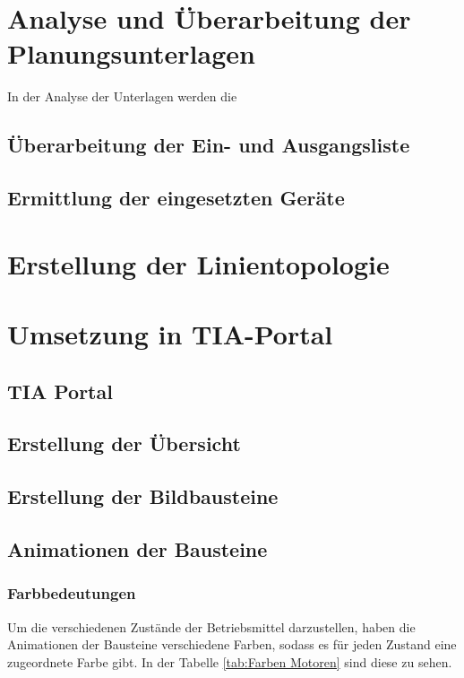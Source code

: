 \chapter{Analyse und Überarbeitung der Planungsunterlagen}

In der Analyse der Unterlagen werden die 

\section{Überarbeitung der Ein- und Ausgangsliste}

\section{Ermittlung der eingesetzten Geräte}

\chapter{Erstellung der Linientopologie}



\chapter{Umsetzung in TIA-Portal}

\section{TIA Portal}
\section{Erstellung der Übersicht}
\section{Erstellung der Bildbausteine}
\section{Animationen der Bausteine}
\subsection{Farbbedeutungen}

Um die verschiedenen Zustände der Betriebsmittel darzustellen, haben die Animationen der Bausteine verschiedene Farben, sodass es für jeden Zustand eine zugeordnete Farbe gibt. In der Tabelle \ref{tab:Farben Motoren} sind diese zu sehen.

